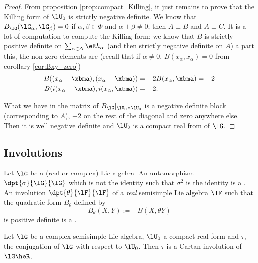 \begin{proof}
From proposition \ref{prop:compact_Killing}, it just remains to prove that the Killing form of $\lU_0$ is strictly negative definite. We know that $B_{\lG}(\lG_{\alpha},\lG_{\beta})=0$ if $\alpha,\beta\in\Phi$ and $\alpha+\beta\neq 0$; then $A\perp B$ and $A\perp C$. It is a lot of computation to compute the Killing form; we know that $B$ is strictly positive definite on $\sum_{\alpha\in\Delta}\eR h_{\alpha}$ (and then strictly negative definite on $A$) a part this, the non zero elements are (recall that if $\alpha\neq 0$, $B( x_{\alpha}, x_{\alpha})=0$ from corollary \ref{cor:Bxy_zero})
\[
\begin{split}
  B( ( x_{\alpha}-\xbma),( x_{\alpha}-\xbma) )&=-2B( x_{\alpha},\xbma)=-2\\
  B(i( x_{\alpha}+\xbma),i( x_{\alpha},\xbma))&=-2.
\end{split}  
\]

What we have in the matrix of $B_{\lG}|_{\lU_0\times\lU_0}$ is a negative definite block (corresponding to $A$), $-2$ on the rest of the diagonal and zero anywhere else. Then it is well negative definite and $\lU_0$ is a compact real from of $\lG$.
\end{proof}

\subsection{Involutions}

Let $\lG$ be a (real or complex) Lie algebra. An automorphism $\dpt{\sigma}{\lG}{\lG}$ which is not the identity such that $\sigma^2$ is the identity is a . An involution $\dpt{\theta}{\lF}{\lF}$ of a \emph{real} semisimple Lie algebra $\lF$ such that the quadratic form $B_{\theta}$ defined by
\[
   B_{\theta}(X,Y):=-B(X,\theta Y)
\]
is positive definite is a .

\begin{proposition}
Let $\lG$ be a complex semisimple Lie algebra, $\lU_0$ a compact real form and $\tau$, the conjugation of $\lG$ with respect to $\lU_0$. Then $\tau$ is a Cartan involution of $\lG\heR$.
\label{prop:conj_invol}
\end{proposition}

